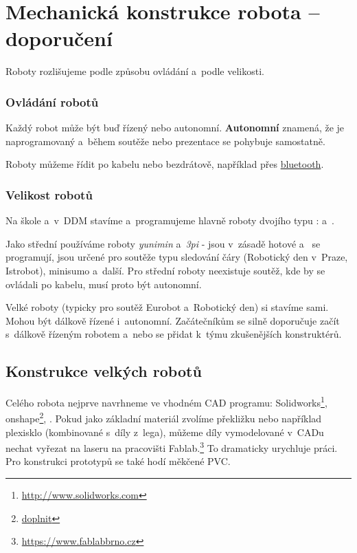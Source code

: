 \section{Mechanická konstrukce robota -- doporučení}
 
\label{konstrukce}
  

Roboty rozlišujeme podle způsobu ovládání a~podle velikosti. 

\subsubsection*{Ovládání robotů} 

\hypertarget{autonomni}{}

Každý robot může být buď řízený nebo autonomní.
 {\bf Autonomní }znamená, že je naprogramovaný a~během soutěže nebo prezentace se pohybuje samostatně.  

Roboty můžeme řídit po kabelu nebo bezdrátově, například přes  \hyperlink{bluetooth}{bluetooth}.   

 
\subsubsection*{Velikost robotů} 
 
Na škole a~v~DDM stavíme a~programujeme hlavně roboty dvojího typu :
 a~. 

  Jako střední používáme roboty {\it yunimin} a~{\it 3pi} - jsou v~zásadě hotové
a~ se programují, jsou určené pro soutěže typu sledování čáry (Robotický den v~Praze, Istrobot), minisumo a~další. 
Pro střední roboty neexistuje soutěž, kde by se ovládali po kabelu, musí proto být autonomní.    
 
 Velké roboty (typicky pro soutěž Eurobot a~Robotický den) si stavíme sami. 
 Mohou být dálkově řízené i~autonomní. 
 Začátečníkům se silně doporučuje začít s~dálkově řízeným robotem a~nebo se přidat k~týmu zkušenějších konstruktérů.   
 
\subsection{Konstrukce velkých robotů}
 
Celého robota nejprve navrhneme ve vhodném  CAD programu: Solidworks\footnote{\url{http://www.solidworks.com}}, onshape\footnote{\url{ doplnit}}, 
.  
 Pokud jako základní materiál zvolíme překližku nebo například plexisklo (kombinované s~díly z~lega),
  můžeme díly vymodelované v~CADu nechat vyřezat na laseru na pracovišti Fablab.\footnote{\url{https://www.fablabbrno.cz}} 
  To dramaticky urychluje práci.    
 Pro konstrukci prototypů se také hodí měkčené PVC.  


